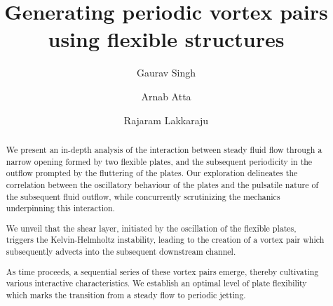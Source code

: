 \documentclass[final,3p,10pt,times,review,authoryear]{elsarticle}
\begin{document}
\begin{frontmatter}
\title{Generating periodic vortex pairs using flexible structures}


\author[inst1]{Gaurav Singh}
        
\author[inst1,inst3]{Arnab Atta}
\author[inst1,inst2]{Rajaram Lakkaraju}
        


	\begin{abstract}
	We present an in-depth analysis of the interaction between steady fluid flow through a narrow opening formed by two flexible plates, and the subsequent periodicity in the outflow prompted by the fluttering of the plates. Our exploration delineates the correlation between the oscillatory behaviour of the plates and the pulsatile nature of the subsequent fluid outflow, while concurrently scrutinizing the mechanics underpinning this interaction. 
	
	We unveil that the shear layer, initiated by the oscillation of the flexible plates, triggers the Kelvin-Helmholtz instability, leading to the creation of a vortex pair which subsequently advects into the subsequent downstream channel. 
	
	As time proceeds, a sequential series of these vortex pairs emerge, thereby cultivating various interactive characteristics. We establish an optimal level of plate flexibility which marks the transition from a steady flow to periodic jetting.
	

\end{abstract}
\end{frontmatter}
\end{document}
